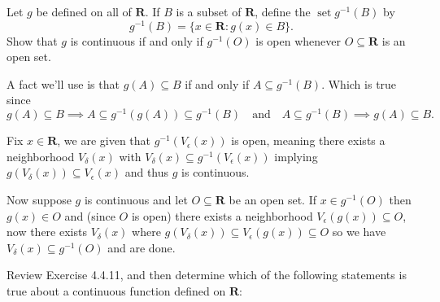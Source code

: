 \begin{exercise}
  Let $g$ be defined on all of $\mathbf{R}$. If $B$ is a subset of $\mathbf{R}$, define the $\operatorname{set} g^{-1}(B)$ by
  $$
  g^{-1}(B)=\{x \in \mathbf{R}: g(x) \in B\} .
  $$
  Show that $g$ is continuous if and only if $g^{-1}(O)$ is open whenever $O \subseteq \mathbf{R}$ is an open set.
\end{exercise}

\begin{solution}
  A fact we'll use is that $g(A) \subseteq B$ if and only if $A \subseteq g^{-1}(B)$. Which is true since
  $$
  g(A) \subseteq B \implies A \subseteq g^{-1}(g(A)) \subseteq g^{-1}(B)
  \quad\text{and}\quad
  A \subseteq g^{-1}(B) \implies g(A) \subseteq B.
  $$

  Fix $x \in \mathbf{R}$, we are given that $g^{-1}(V_\epsilon(x))$ is open, meaning there exists a neighborhood $V_\delta(x)$ with $V_\delta(x) \subseteq g^{-1}(V_\epsilon(x))$ implying $g(V_\delta(x)) \subseteq V_\epsilon(x)$ and thus $g$ is continuous.

  Now suppose $g$ is continuous and let $O \subseteq \mathbf{R}$ be an open set. If $x \in g^{-1}(O)$ then $g(x) \in O$ and (since $O$ is open) there exists a neighborhood $V_\epsilon(g(x)) \subseteq O$, now there exists $V_\delta(x)$ where $g(V_\delta(x)) \subseteq V_\epsilon(g(x)) \subseteq O$ so we have $V_\delta(x) \subseteq g^{-1}(O)$ and are done.
\end{solution}

\begin{exercise}
  Review Exercise 4.4.11, and then determine which of the following statements is true about a continuous function defined on $\mathbf{R}$:
\end{exercise}

\begin{solution}
\end{solution}

